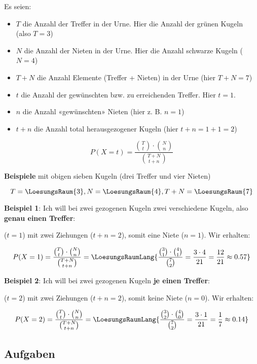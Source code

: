Es seien:
\begin{itemize}
\item $T$ die Anzahl der Treffer in der Urne. Hier die Anzahl der grünen Kugeln (also $T = 3$)
\item $N$ die Anzahl der Nieten in der Urne. Hier die Anzahl schwarze Kugeln ($N=4$)
\item $T+N$ die Anzahl Elemente (Treffer + Nieten) in der Urne (hier $T+N = 7$)

\item $t$ die Anzahl der gewünschten bzw. zu erreichenden Treffer. Hier \zB $t=1$.
  
\item $n$ die Anzahl «gewünschten» Nieten (hier z. B. $n = 1$)
\item $t+n$ die Anzahl total herausgezogener Kugeln (hier $t+n=1+1=2$)
\end{itemize}

\newpage


\begin{gesetz}{}{}
$$P(X=t) = \frac{ {T\choose t} \cdot{} {{N}\choose {n}}}{{{T+N} \choose {t+n}}}$$
\end{gesetz}

\textbf{Beispiele} mit obigen sieben Kugeln (drei Treffer und vier
Nieten)
\leserluft

$$T=\LoesungsRaum{3}, N=\LoesungsRaum{4}, T+N=\LoesungsRaum{7}$$


\textbf{Beispiel 1}: Ich will bei zwei gezogenen Kugeln zwei
verschiedene Kugeln, also \textbf{genau einen Treffer}:

($t=1$) mit zwei Ziehungen ($t+n=2$), somit eine Niete ($n=1$).
Wir erhalten:

$$P(X=1) = \frac{ {T\choose t} \cdot{} {{N}\choose {n}}}{{{T+N}
    \choose {t+n}}} = \LoesungsRaumLang{\frac{ {3\choose 1} \cdot{} {{4}\choose {1}}}{{7
    \choose 2}} = \frac{3\cdot{4}}{21} = \frac{12}{21} \approx 0.57}$$

\textbf{Beispiel 2}: Ich will bei zwei gezogenen Kugeln \textbf{je einen Treffer}:

($t=2$) mit zwei Ziehungen ($t+n=2$), somit keine Niete ($n=0$).
Wir erhalten:

$$P(X=2) = \frac{ {T\choose t} \cdot{} {{N}\choose {n}}}{{{T+N}
    \choose {t+n}}} = \LoesungsRaumLang{\frac{ {3\choose 2} \cdot{} {{4}\choose {0}}}{{7
    \choose 2}} = \frac{3\cdot{}1}{21} = \frac17 \approx 0.14}$$
\newpage

\subsection*{Aufgaben}

